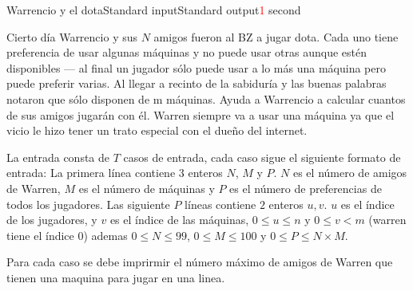 \begin{problem}{Warrencio y el dota}{Standard input}{Standard output}{\textcolor{red}{1} second}{}


Cierto día Warrencio y sus $N$ amigos fueron al BZ a jugar dota. Cada uno tiene preferencia de usar algunas máquinas y no puede usar otras aunque estén disponibles --- al final un jugador sólo puede usar a lo más una máquina pero puede preferir varias. Al llegar a recinto de la sabiduría y las buenas palabras notaron que sólo disponen de m máquinas. Ayuda a Warrencio a calcular cuantos de sus amigos jugarán con él. Warren siempre va a usar una máquina ya que el vicio le hizo tener un trato especial con el dueño del internet.

\InputFile
La entrada consta de $T$ casos de entrada, cada caso sigue el siguiente formato de entrada: La primera línea contiene $3$ enteros $N$, $M $ y $P$. $N$ es el número de amigos de Warren, $M$ es el número de máquinas y $P$ es el número de preferencias de todos los jugadores. Las siguiente $P$ líneas contiene $2$ enteros $u,v$. $u$ es el índice de los jugadores, y $v$ es el índice de las máquinas, $0 \leq u \leq n$  y $0 \leq v<m$ (warren tiene el índice $0$) ademas $0 \leq N \leq 99$, $0 \leq M \leq 100$ y $0 \leq P \leq N\times M$.

\OutputFile
Para cada caso se debe imprirmir el número máximo de amigos de Warren que tienen una maquina para jugar en una linea.  

\Example

\begin{example}
\end{example}

\end{problem}
